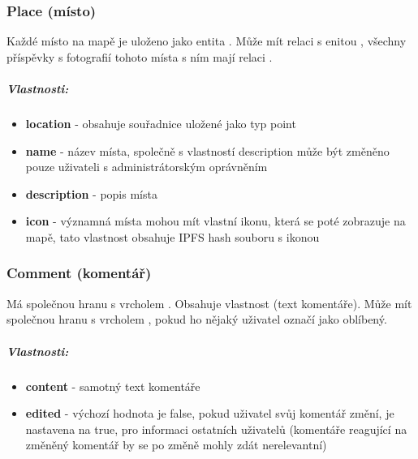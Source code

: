 \documentclass[12pt, a4paper,
 twoside,        %
 openright
]{report}
\newenvironment{propertiesItemize}{
  \begin{itemize}  \begin{itemize}{ 
  }}
  {\end{itemize}\end{itemize}}
\begin{document}
    	            \subsubsection{Place (místo)} Každé místo na mapě je uloženo jako entita . Může mít relaci  s enitou , všechny příspěvky s fotografií tohoto místa s ním mají relaci .
    	             \subparagraph{Vlastnosti:}  
                           \begin{propertiesItemize}
                                \item \textbf{location} - obsahuje souřadnice uložené jako typ point 
                                \item \textbf{name} - název místa, společně s vlastností description může být změněno pouze uživateli s administrátorským oprávněním
                                \item \textbf{description} - popis místa
                                \item \textbf{icon} - významná místa mohou mít vlastní ikonu, která se poté zobrazuje na mapě, tato vlastnost obsahuje IPFS hash souboru s ikonou
                        \end{propertiesItemize}
    	            \subsubsection{Comment (komentář)} Má společnou hranu  s vrcholem . Obsahuje vlastnost  (text komentáře). Může mít společnou hranu  s vrcholem , pokud ho nějaký uživatel označí jako oblíbený.
    	                        \subparagraph{Vlastnosti:}  
                           \begin{propertiesItemize}
                                \item \textbf{content} - samotný text komentáře 
                                \item \textbf{edited} - výchozí hodnota je false, pokud uživatel svůj komentář změní, je nastavena na true, pro informaci ostatních uživatelů (komentáře reagující na změněný komentář by se po změně mohly zdát nerelevantní) 
                        \end{propertiesItemize}
\end{document}
